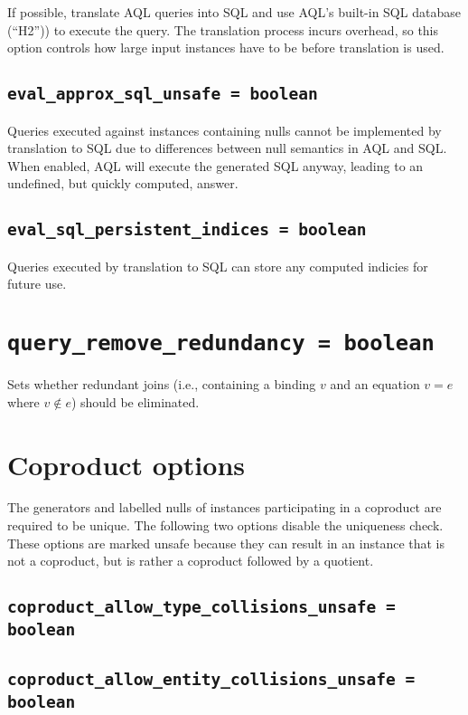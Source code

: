 \documentclass[10pt]{book}
\begin{document}
If possible, translate AQL queries into SQL and use AQL's built-in SQL database (``H2'')) to execute the query.  The translation process incurs overhead, so this option controls how large input instances have to be before translation is used.

\subsection{{\tt eval\_approx\_sql\_unsafe = boolean}}

Queries executed against instances containing nulls cannot be implemented by translation to SQL due to differences between null semantics in AQL and SQL.  
When enabled, AQL will execute the generated SQL anyway, leading to an undefined, but quickly computed, answer.  

\subsection{{\tt eval\_sql\_persistent\_indices = boolean}}

Queries executed by translation to SQL can store any computed indicies for future use. 

\section{{\tt query\_remove\_redundancy = boolean}}

Sets whether redundant joins (i.e., containing a binding $v$ and an equation $v = e$ where $v \notin e$) should be eliminated.
\section{Coproduct options}

The generators and labelled nulls of instances participating in a coproduct are required to be unique.  The following two options disable the uniqueness check.  These options are marked unsafe because they can result in an instance that is not a coproduct, but is rather a coproduct followed by a quotient.

\subsection{{\tt coproduct\_allow\_type\_collisions\_unsafe = boolean}}

\subsection{{\tt coproduct\_allow\_entity\_collisions\_unsafe = boolean}}
\end{document}
